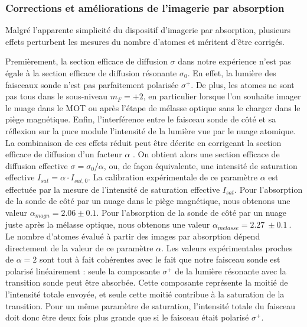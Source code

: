 \clearpage
\subsubsection*{Corrections et améliorations de l'imagerie par absorption}
\noindent Malgré l'apparente simplicité du dispositif d'imagerie par absorption, plusieurs effets perturbent les mesures du nombre d'atomes et méritent d'être corrigés.

Premièrement, la section efficace de diffusion $\sigma$ dans notre expérience n'est pas égale à la section efficace de diffusion résonante $\sigma_0$.
En effet, la lumière des faisceaux sonde n'est pas parfaitement polarisée $\sigma^+$.
De plus, les atomes ne sont pas tous dans le sous-niveau $m_F=+2$, en particulier lorsque l'on souhaite imager le nuage dans le MOT ou après l'étape de mélasse optique sans le charger dans le piège magnétique.
Enfin, l'interférence entre le faisceau sonde de côté et sa réflexion sur la puce module l'intensité de la lumière vue par le nuage atomique.
La combinaison de ces effets réduit peut être décrite en corrigeant la section efficace de diffusion d'un facteur $\alpha$ \cite{PHD_CELISTRINO,MX_GUERYODELIN_SATABSIM}.
On obtient alors une section efficace de diffusion effective $\sigma = \sigma_0 / \alpha$, ou, de façon équivalente, une intensité de saturation effective $I_{sat} = \alpha\cdot I_{sat,0}$.
La calibration expérimentale de ce paramètre $\alpha$ est effectuée par la mesure de l'intensité de saturation effective $I_{sat}$.
Pour l'absorption de la sonde de côté par un nuage dans le piège magnétique, nous obtenons une valeur $\alpha_{magn} = \num{2.06} \pm \num{0.1}$.
Pour l'absorption de la sonde de côté par un nuage juste après la mélasse optique, nous obtenons une valeur $\alpha_{melasse} = \SI{2.27}{} \pm \SI{0.1}{}$.
Le nombre d'atomes évalué à partir des images par absorption dépend directement de la valeur de ce paramètre $\alpha$.
Les valeurs expérimentales proches de $\alpha=2$ sont tout à fait cohérentes avec le fait que notre faisceau sonde est polarisé linéairement : seule la composante $\sigma^+$ de la lumière résonante avec la transition sonde peut être absorbée.
Cette composante représente la moitié de l'intensité totale envoyée, et seule cette moitié contribue à la saturation de la transition.
Pour un même paramètre de saturation, l'intensité totale du faisceau doit donc être deux fois plus grande que si le faisceau était polarisé $\sigma^+$.
	
